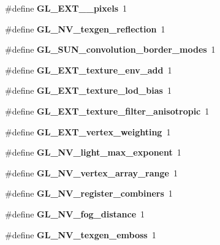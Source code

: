 \begin{DoxyCompactItemize}
\item 
\#define {\bfseries G\+L\+\_\+\+E\+X\+T\+\_\+\_\+pixels}~1\label{_s_d_l__opengl_8h_a92f6047317bbaf986a560eb7c37c7d5c}

\item 
\#define {\bfseries G\+L\+\_\+\+N\+V\+\_\+texgen\+\_\+reflection}~1\label{_s_d_l__opengl_8h_a722d5ab1c417c2fce02fe629f2bbd5ab}

\item 
\#define {\bfseries G\+L\+\_\+\+S\+U\+N\+\_\+convolution\+\_\+border\+\_\+modes}~1\label{_s_d_l__opengl_8h_a706c7120f891da1207e72701c9134391}

\item 
\#define {\bfseries G\+L\+\_\+\+E\+X\+T\+\_\+texture\+\_\+env\+\_\+add}~1\label{_s_d_l__opengl_8h_a9253db4c5ca0924f231b7d96e9a60aab}

\item 
\#define {\bfseries G\+L\+\_\+\+E\+X\+T\+\_\+texture\+\_\+lod\+\_\+bias}~1\label{_s_d_l__opengl_8h_af9a0767ed458270595e03436cf5eb2ec}

\item 
\#define {\bfseries G\+L\+\_\+\+E\+X\+T\+\_\+texture\+\_\+filter\+\_\+anisotropic}~1\label{_s_d_l__opengl_8h_a67b45408b3b529072cba6ed496e7e5bc}

\item 
\#define {\bfseries G\+L\+\_\+\+E\+X\+T\+\_\+vertex\+\_\+weighting}~1\label{_s_d_l__opengl_8h_a94978d483e00ff8dfd94b50aac7d698c}

\item 
\#define {\bfseries G\+L\+\_\+\+N\+V\+\_\+light\+\_\+max\+\_\+exponent}~1\label{_s_d_l__opengl_8h_abba68da43e96fe9d9a495bf67e805e2a}

\item 
\#define {\bfseries G\+L\+\_\+\+N\+V\+\_\+vertex\+\_\+array\+\_\+range}~1\label{_s_d_l__opengl_8h_a8d69619d2a177449a29e5651ad522434}

\item 
\#define {\bfseries G\+L\+\_\+\+N\+V\+\_\+register\+\_\+combiners}~1\label{_s_d_l__opengl_8h_a11dc0bbde9bc09d5ca48c41f01e19adb}

\item 
\#define {\bfseries G\+L\+\_\+\+N\+V\+\_\+fog\+\_\+distance}~1\label{_s_d_l__opengl_8h_a0c360942b0df75b640d13aba45a7d890}

\item 
\#define {\bfseries G\+L\+\_\+\+N\+V\+\_\+texgen\+\_\+emboss}~1\label{_s_d_l__opengl_8h_a6bca756b4bc83b2d2e3fb9741ce90e36}


\end{DoxyCompactItemize}
